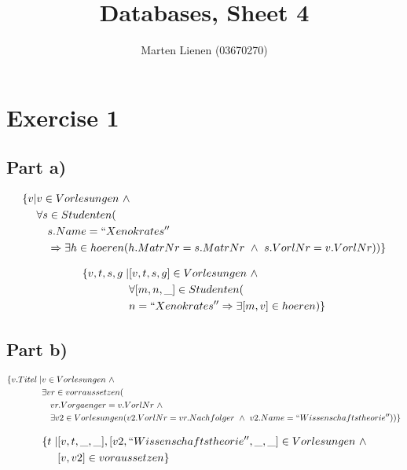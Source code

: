 \documentclass[10pt,a4paper]{article}
\title{Databases, Sheet 4}
\author{Marten Lienen (03670270)}
\begin{document}
\maketitle

\section*{Exercise 1}

\subsection*{Part a)}

\begin{align*}
  \{ v | & v \in Vorlesungen\ \land\\
         & \forall s \in Studenten (\\
         & \quad s.Name = ``Xenokrates''\\
         & \quad \Rightarrow \exists h \in hoeren (h.MatrNr = s.MatrNr\ \land\ s.VorlNr = v.VorlNr)) \}
\end{align*}

\begin{align*}
  \{ v, t, s, g \mid & [v, t, s, g] \in Vorlesungen\ \land\\
                     & \forall [m, n, \_] \in Studenten (\\
                     & n = ``Xenokrates'' \Rightarrow \exists [m, v] \in hoeren) \}
\end{align*}

\subsection*{Part b)}

\begin{align*}
  \{ v.Titel \mid & v \in Vorlesungen\ \land\\
                  & \exists vr \in vorraussetzen (\\
                  & \quad vr.Vorgaenger = v.VorlNr\ \land\\
                  & \quad \exists v2 \in Vorlesungen (v2.VorlNr = vr.Nachfolger\ \land\ v2.Name = ``Wissenschaftstheorie'')) \}
\end{align*}

\begin{align*}
  \{ t \mid & [v, t, \_, \_], [v2, ``Wissenschaftstheorie'', \_, \_] \in Vorlesungen\ \land\\
            & [v, v2] \in voraussetzen \}
\end{align*}
\end{document}
